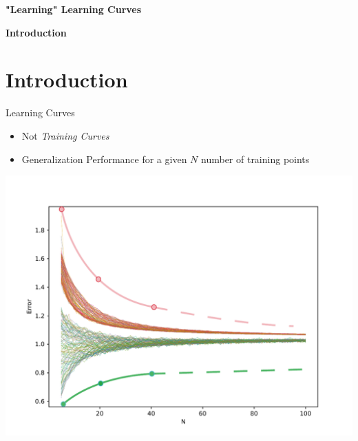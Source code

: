 \documentclass[aspectratio=169]{beamer}
\author{\authorlabel}
\newcommand{\mysubtitle}{\color{Pink}\huge{\textbf{"Learning" Learning Curves}}}
\newcommand{\intro}{\color{Pink}\huge{\textbf{Introduction}}}
\begin{document}


\begin{frame}
	\centering
	\mysubtitle
\end{frame}

\begin{frame}
	\centering
	\intro
\end{frame}

\section{Introduction}
\begin{frame}{Learning Curves}
  \begin{minipage}{0.5\textwidth}
    \begin{itemize}
      \item<1> Not \textit{Training Curves}
      \item<2> Generalization Performance for a given $N$ number of training points 
    \end{itemize}
  \end{minipage}%
  \begin{minipage}{0.5\textwidth}
    \centering
    \includegraphics[width=\textwidth]{figures/lc.pdf}
  \end{minipage}
\end{frame}
\end{document}
